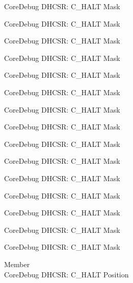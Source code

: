 \begin{DoxyRefList}
\label{deprecated__deprecated000126}%
%
Core\+Debug DHCSR\+: C\+\_\+\+HALT Mask 

\label{deprecated__deprecated000182}%
%
Core\+Debug DHCSR\+: C\+\_\+\+HALT Mask 

\label{deprecated__deprecated000265}%
%
Core\+Debug DHCSR\+: C\+\_\+\+HALT Mask 

\label{deprecated__deprecated000324}%
%
Core\+Debug DHCSR\+: C\+\_\+\+HALT Mask 

\label{deprecated__deprecated000400}%
%
Core\+Debug DHCSR\+: C\+\_\+\+HALT Mask 

\label{deprecated__deprecated000489}%
%
Core\+Debug DHCSR\+: C\+\_\+\+HALT Mask 

\label{deprecated__deprecated000591}%
%
Core\+Debug DHCSR\+: C\+\_\+\+HALT Mask 

\label{deprecated__deprecated000697}%
%
Core\+Debug DHCSR\+: C\+\_\+\+HALT Mask 

\label{deprecated__deprecated000785}%
%
Core\+Debug DHCSR\+: C\+\_\+\+HALT Mask 

\label{deprecated__deprecated000841}%
%
Core\+Debug DHCSR\+: C\+\_\+\+HALT Mask 

\label{deprecated__deprecated000924}%
%
Core\+Debug DHCSR\+: C\+\_\+\+HALT Mask 

\label{deprecated__deprecated000983}%
%
Core\+Debug DHCSR\+: C\+\_\+\+HALT Mask 

\label{deprecated__deprecated001059}%
%
Core\+Debug DHCSR\+: C\+\_\+\+HALT Mask 

\label{deprecated__deprecated001148}%
%
Core\+Debug DHCSR\+: C\+\_\+\+HALT Mask 

\label{deprecated__deprecated001250}%
%
Core\+Debug DHCSR\+: C\+\_\+\+HALT Mask  
\item[Member \doxylink{group___c_m_s_i_s___core_debug_gaddf1d43f8857e4efc3dc4e6b15509692}{Core\+Debug\+\_\+\+DHCSR\+\_\+\+C\+\_\+\+HALT\+\_\+\+Pos} ]\hfill \\
\label{deprecated__deprecated000037}%
%
Core\+Debug DHCSR\+: C\+\_\+\+HALT Position 


\end{DoxyRefList}
